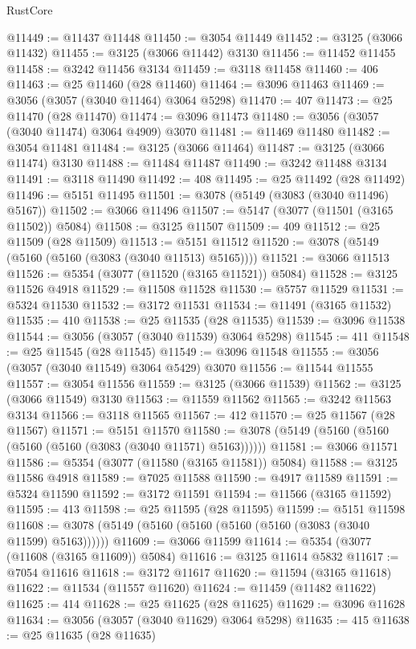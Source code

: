 \begin{lexlean}{RustCore}
\begin{coremodule}
@11449 := @11437 @11448
@11450 := @3054 @11449
@11452 := @3125 (@3066 @11432)
@11455 := @3125 (@3066 @11442) @3130
@11456 := @11452 @11455
@11458 := @3242 @11456 @3134
@11459 := @3118 @11458
@11460 := 406
@11463 := @25 @11460 (@28 @11460)
@11464 := @3096 @11463
@11469 := @3056 (@3057 (@3040 @11464) @3064 @5298)
@11470 := 407
@11473 := @25 @11470 (@28 @11470)
@11474 := @3096 @11473
@11480 := @3056 (@3057 (@3040 @11474) @3064 @4909) @3070
@11481 := @11469 @11480
@11482 := @3054 @11481
@11484 := @3125 (@3066 @11464)
@11487 := @3125 (@3066 @11474) @3130
@11488 := @11484 @11487
@11490 := @3242 @11488 @3134
@11491 := @3118 @11490
@11492 := 408
@11495 := @25 @11492 (@28 @11492)
@11496 := @5151 @11495
@11501 := @3078 (@5149 (@3083 (@3040 @11496) @5167))
@11502 := @3066 @11496
@11507 := @5147 (@3077 (@11501 (@3165 @11502)) @5084)
@11508 := @3125 @11507
@11509 := 409
@11512 := @25 @11509 (@28 @11509)
@11513 := @5151 @11512
@11520 := @3078 (@5149 (@5160 (@5160 (@3083 (@3040 @11513) @5165))))
@11521 := @3066 @11513
@11526 := @5354 (@3077 (@11520 (@3165 @11521)) @5084)
@11528 := @3125 @11526 @4918
@11529 := @11508 @11528
@11530 := @5757 @11529
@11531 := @5324 @11530
@11532 := @3172 @11531
@11534 := @11491 (@3165 @11532)
@11535 := 410
@11538 := @25 @11535 (@28 @11535)
@11539 := @3096 @11538
@11544 := @3056 (@3057 (@3040 @11539) @3064 @5298)
@11545 := 411
@11548 := @25 @11545 (@28 @11545)
@11549 := @3096 @11548
@11555 := @3056 (@3057 (@3040 @11549) @3064 @5429) @3070
@11556 := @11544 @11555
@11557 := @3054 @11556
@11559 := @3125 (@3066 @11539)
@11562 := @3125 (@3066 @11549) @3130
@11563 := @11559 @11562
@11565 := @3242 @11563 @3134
@11566 := @3118 @11565
@11567 := 412
@11570 := @25 @11567 (@28 @11567)
@11571 := @5151 @11570
@11580 := @3078 (@5149 (@5160 (@5160 (@5160 (@5160 (@3083 (@3040 @11571) @5163))))))
@11581 := @3066 @11571
@11586 := @5354 (@3077 (@11580 (@3165 @11581)) @5084)
@11588 := @3125 @11586 @4918
@11589 := @7025 @11588
@11590 := @4917 @11589
@11591 := @5324 @11590
@11592 := @3172 @11591
@11594 := @11566 (@3165 @11592)
@11595 := 413
@11598 := @25 @11595 (@28 @11595)
@11599 := @5151 @11598
@11608 := @3078 (@5149 (@5160 (@5160 (@5160 (@5160 (@3083 (@3040 @11599) @5163))))))
@11609 := @3066 @11599
@11614 := @5354 (@3077 (@11608 (@3165 @11609)) @5084)
@11616 := @3125 @11614 @5832
@11617 := @7054 @11616
@11618 := @3172 @11617
@11620 := @11594 (@3165 @11618)
@11622 := @11534 (@11557 @11620)
@11624 := @11459 (@11482 @11622)
@11625 := 414
@11628 := @25 @11625 (@28 @11625)
@11629 := @3096 @11628
@11634 := @3056 (@3057 (@3040 @11629) @3064 @5298)
@11635 := 415
@11638 := @25 @11635 (@28 @11635)

\end{coremodule}
\end{lexlean}
